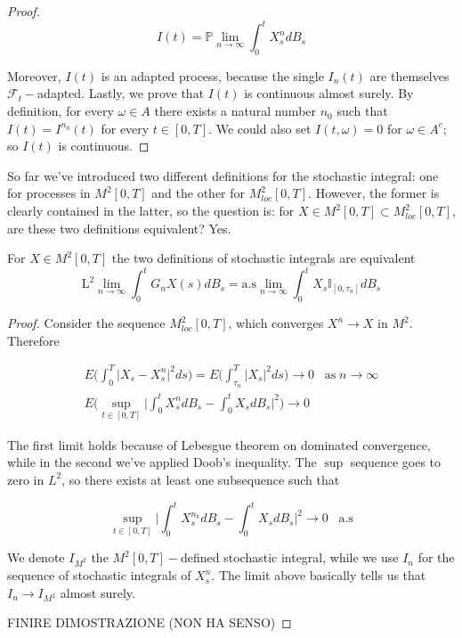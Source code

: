 \begin{proof}
    \begin{equation*}
        I(t) = \mathbb{P}\lim_{n \to \infty} \int_0^t X_s^n dB_s
    \end{equation*}

    Moreover, $I(t)$ is an adapted process, because the single $I_n(t)$ are themselves $\mathcal{F}_t-$adapted. Lastly, we prove that $I(t)$ is continuous almost surely. By definition, for every $\omega \in A$ there exists a natural number $n_0$ such that $I(t) = I^{n_0}(t)$ for every $t \in [0,T]$. We could also set $I(t,\omega) = 0$ for $\omega \in A^c$; so $I(t)$ is continuous. 
\end{proof}

So far we've introduced two different definitions for the stochastic integral: one for processes in $M^2[0,T]$ and the other for $M^2_{loc}[0,T]$. However, the former is clearly contained in the latter, so the question is: for $X \in M^2[0,T] \subset M^2_{loc}[0,T]$, are these two definitions equivalent? Yes.

\begin{proposition}
    For $X \in M^2[0,T]$ the two definitions of stochastic integrals are equivalent
    \begin{equation*}
        \text{L}^2 \lim_{n \to \infty} \int_0^t G_n X(s) dB_s = \text{a.s} \lim_{n \to \infty} \int_0^t X_s \mathbb{I}_{[0,\tau_n]} dB_s 
    \end{equation*}
\end{proposition}
\begin{proof}
Consider the sequence $M^2_{loc}[0,T]$, which converges $X^n \to X$ in $M^2$. Therefore

\begin{gather*}
    E\Bigg( \int_0^T \big\vert X_s - X^{n}_s \big\vert^2 ds \Bigg) = E\Bigg( \int_{\tau_n}^T \big\vert X_s \big\vert^2 ds \Bigg) \to 0 \;\;\; \text{as} \; n \to \infty \\
    E\Bigg( \sup_{t \in [0,T]} \Bigg\vert \int_0^t X_s^n dB_s - \int_0^t X_s dB_s \Bigg\vert^2 \Bigg) \to 0
\end{gather*}

The first limit holds because of Lebesgue theorem on dominated convergence, while in the second we've applied Doob's inequality. The $\sup$ sequence goes to zero in $L^2$, so there exists at least one subsequence such that

\begin{equation*}
    \sup_{t \in [0,T]} \Bigg\vert \int_0^t X_s^{n_k} dB_s - \int_0^t X_s dB_s \Bigg\vert^2 \to 0 \;\;\; \text{a.s}
\end{equation*}

We denote $I_{M^2}$ the $M^2[0,T]-$defined stochastic integral, while we use $I_n$ for the sequence of stochastic integrals of $X^n_s$. The limit above basically tells us that $I_n \to I_{M^2}$ almost surely. 

FINIRE DIMOSTRAZIONE (NON HA SENSO)
\end{proof}

